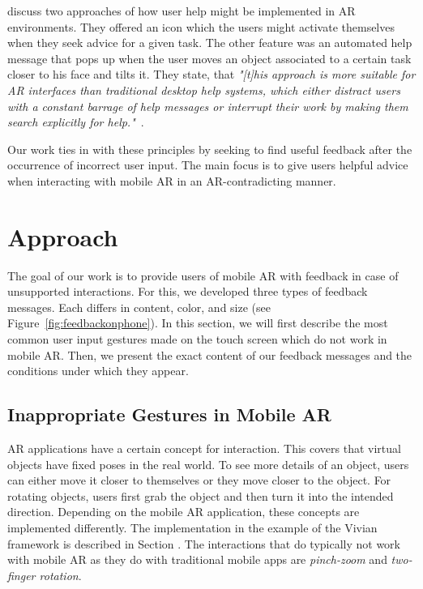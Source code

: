 \documentclass[manuscript]{acmart}
\begin{document}
		\citeauthor{Poupyrev2002} discuss two approaches of how user help might be implemented in \ac{AR} environments. They offered  an icon which the users might activate themselves when they seek advice for a given task. The other feature was an automated help message that pops up when the user moves an object associated to a certain task closer to his face and tilts it. They state, that \textit{"\textnormal{[t]}his approach is more suitable for AR interfaces than traditional desktop help systems, which either distract users with a constant barrage of help messages or interrupt their work by making them search explicitly for help."}~\cite{Poupyrev2002}.
		
		Our work ties in with these principles by seeking to find useful feedback after the occurrence of incorrect user input. The main focus is to give users helpful advice when interacting with mobile AR in an AR-contradicting manner.

	\section{Approach}\label{sec:approach}
		The goal of our work is to provide users of mobile \ac{AR} with feedback in case of unsupported interactions. For this, we developed three types of feedback messages. Each differs in content, color, and size (see Figure~\ref{fig:feedbackonphone}). In this section, we will first describe the most common user input gestures made on the touch screen which do not work in mobile \ac{AR}. Then, we present the exact content of our feedback messages and the conditions under which they appear.

		\subsection{Inappropriate Gestures in Mobile AR}\label{ssec:incorrectinput}
		\ac{AR} applications have a certain concept for interaction. This covers that virtual objects have fixed poses in the real world. To see more details of an object, users can either move it closer to themselves or they move closer to the object. For rotating objects, users first grab the object and then turn it into the intended direction.
		Depending on the mobile \ac{AR} application, these concepts are implemented differently. The implementation in the example of the Vivian framework is described in Section . The interactions that do typically not work with mobile \ac{AR} as they do with traditional mobile apps are \emph{pinch-zoom} and \emph{two-finger rotation}.
\end{document}
